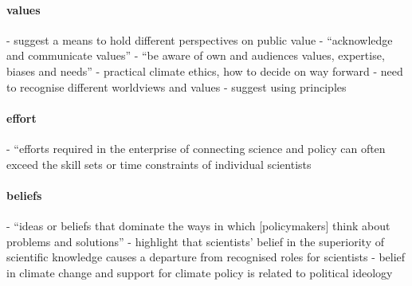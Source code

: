 \paragraph{values}
\cite{GeuijenMCRv2017} - suggest a means to hold different perspectives on public value
\cite{GregoryBW2024} - ``acknowledge and communicate values''
\cite{ElsensohnACDGGKPRS2019} - ``be aware of own and audiences values, expertise, biases and needs''
\cite{VoisardW2023} - practical climate ethics, how to decide on way forward
\cite{PascualEtAl2018} - need to recognise different worldviews and values
\cite{RogeljLPLWXXXX} - suggest using principles
\paragraph{effort}
\cite{BednarekSHG2015} - ``efforts required in the enterprise of connecting science and policy can often exceed the skill sets or time constraints of individual scientists

\paragraph{beliefs}
\cite{CairneyW2017} - ``ideas or beliefs that dominate the ways in which [policymakers] think about problems and solutions''
\cite{BalvaneraJNOBCDGGKKMPSSW2020} - highlight that scientists' belief in the superiority of scientific knowledge causes a departure from recognised roles for scientists
\cite{BerkebileWeinbergGDVV2024} - belief in climate change and support for climate policy is related to political ideology

